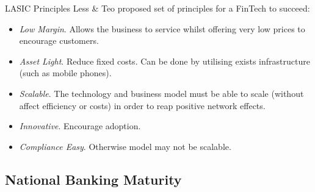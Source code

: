 \documentclass[11pt,a4paper]{article}
\begin{document}
\begin{proposition}{LASIC Principles}
  Less \& Teo proposed set of principles for a FinTech to succeed:
  \begin{itemize}
    \item \textit{Low Margin}. Allows the business to service whilst offering very low prices to encourage customers.
    \item \textit{Asset Light}. Reduce fixed costs. Can be done by utilising exists infrastructure (such as mobile phones).
    \item \textit{Scalable}. The technology and business model must be able to scale (without affect efficiency or costs) in order to reap positive network effects.
    \item \textit{Innovative}. Encourage adoption.
    \item \textit{Compliance Easy}. Otherwise model may not be scalable.
  \end{itemize}
\end{proposition}

\subsection{National Banking Maturity}
\end{document}
